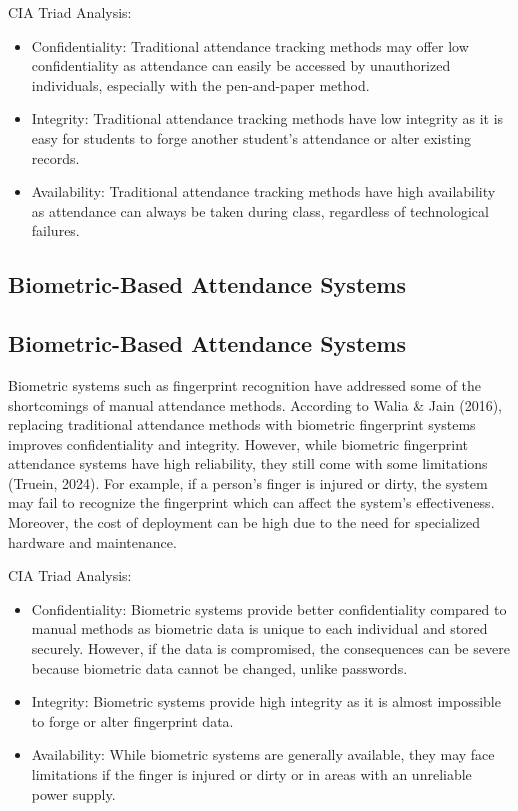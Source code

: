 CIA Triad Analysis:

\begin{itemize}
	\item Confidentiality: Traditional attendance tracking methods may offer low confidentiality as attendance can easily be accessed by unauthorized individuals, especially with the pen-and-paper method.
	\item Integrity: Traditional attendance tracking methods have low integrity as it is easy for students to forge another student's attendance or alter existing records.
	\item Availability: Traditional attendance tracking methods have high availability as attendance can always be taken during class, regardless of technological failures.
\end{itemize}

\subsection{Biometric-Based Attendance Systems}

\subsection{Biometric-Based Attendance Systems}

Biometric systems such as fingerprint recognition have addressed some of the shortcomings of manual attendance methods. According to Walia \& Jain (2016), replacing traditional attendance methods with biometric fingerprint systems improves confidentiality and integrity. However, while biometric fingerprint attendance systems have high reliability, they still come with some limitations (Truein, 2024). For example, if a person’s finger is injured or dirty, the system may fail to recognize the fingerprint which can affect the system’s effectiveness. Moreover, the cost of deployment can be high due to the need for specialized hardware and maintenance.

CIA Triad Analysis:

\begin{itemize}
	\item Confidentiality: Biometric systems provide better confidentiality compared to manual methods as biometric data is unique to each individual and stored securely. However, if the data is compromised, the consequences can be severe because biometric data cannot be changed, unlike passwords.
	\item Integrity: Biometric systems provide high integrity as it is almost impossible to forge or alter fingerprint data.
	\item Availability: While biometric systems are generally available, they may face limitations if the finger is injured or dirty or in areas with an unreliable power supply.
\end{itemize}

